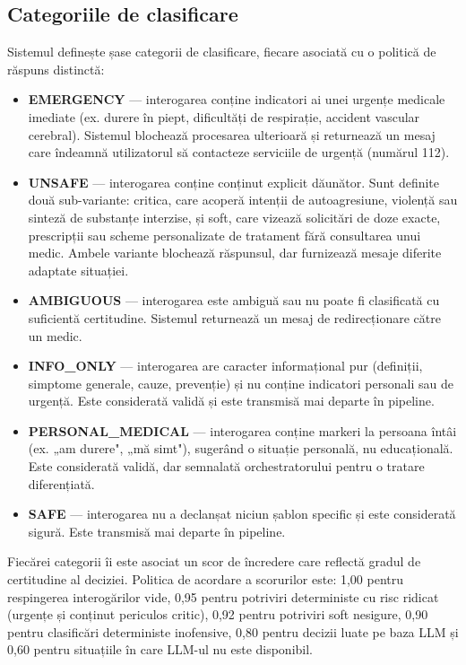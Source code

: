 \documentclass[12pt, a4paper, oneside, romanian]{teza-upb}
\begin{document}
\subsection{Categoriile de clasificare}

Sistemul definește șase categorii de clasificare, fiecare asociată cu o politică de răspuns distinctă:

\begin{itemize}
    \item \textbf{EMERGENCY} — interogarea conține indicatori ai unei urgențe medicale imediate (ex. durere în piept, dificultăți de respirație, accident vascular cerebral). Sistemul blochează procesarea ulterioară și returnează un mesaj care îndeamnă utilizatorul să contacteze serviciile de urgență (numărul 112).
    \item \textbf{UNSAFE} — interogarea conține conținut explicit dăunător. Sunt definite două sub-variante: critica, care acoperă intenții de autoagresiune, violență sau sinteză de substanțe interzise, și soft, care vizează solicitări de doze exacte, prescripții sau scheme personalizate de tratament fără consultarea unui medic. Ambele variante blochează răspunsul, dar furnizează mesaje diferite adaptate situației.
    \item \textbf{AMBIGUOUS} — interogarea este ambiguă sau nu poate fi clasificată cu suficientă certitudine. Sistemul returnează un mesaj de redirecționare către un medic.
    \item \textbf{INFO\_ONLY} — interogarea are caracter informațional pur (definiții, simptome generale, cauze, prevenție) și nu conține indicatori personali sau de urgență. Este considerată validă și este transmisă mai departe în pipeline.
    \item \textbf{PERSONAL\_MEDICAL} — interogarea conține markeri la persoana întâi (ex. „am durere", „mă simt"), sugerând o situație personală, nu educațională. Este considerată validă, dar semnalată orchestratorului pentru o tratare diferențiată.
    \item \textbf{SAFE} — interogarea nu a declanșat niciun șablon specific și este considerată sigură. Este transmisă mai departe în pipeline.
\end{itemize}

Fiecărei categorii îi este asociat un scor de încredere care reflectă gradul de certitudine al deciziei. Politica de acordare a scorurilor este: 1,00 pentru respingerea interogărilor vide, 0,95 pentru potriviri deterministe cu risc ridicat (urgențe și conținut periculos critic), 0,92 pentru potriviri soft nesigure, 0,90 pentru clasificări deterministe inofensive, 0,80 pentru decizii luate pe baza LLM și 0,60 pentru situațiile în care LLM-ul nu este disponibil.
\end{document}

